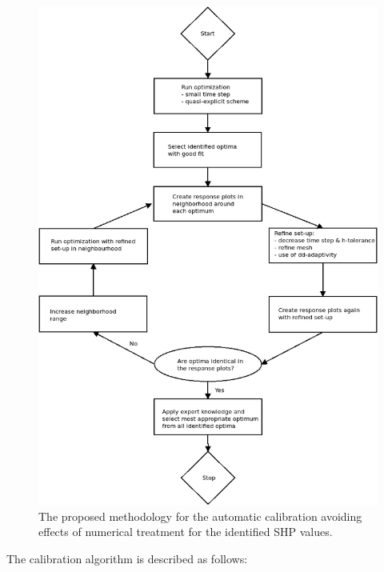 \documentclass[review,times,3p,twocolumn,10pt]{elsarticle}
\begin{document}
\begin{figure}
\centering
\includegraphics[width=12cm]{flowchart/Flow_chart_cb_new.png}
\caption{The proposed methodology for the automatic calibration avoiding effects of numerical treatment for the identified SHP values.}
\label{flowchart}
\end{figure}

The calibration algorithm is described as follows:
\end{document}
